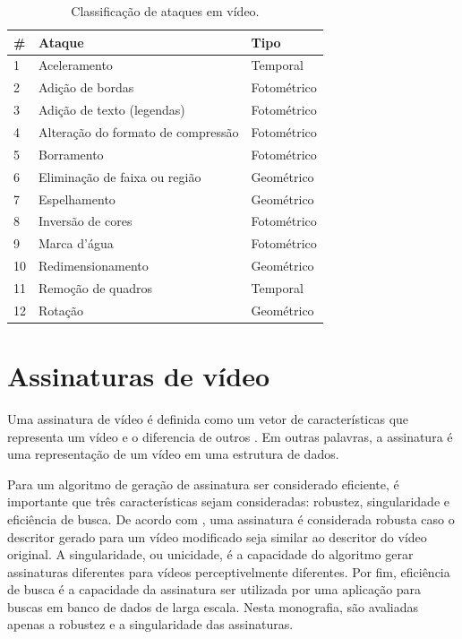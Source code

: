 \begin{table}[!ht]
\centering
\caption{Classificação de ataques em vídeo.}
\label{tab-classificacao-ataques}
\begin{tabular}{|l|l|l|}
\hline
\# & \textbf{Ataque}                    & \textbf{Tipo} \\ \hline
1           & Aceleramento                       & Temporal      \\ \hline
2           & Adição de bordas                   & Fotométrico   \\ \hline
3           & Adição de texto (legendas)         & Fotométrico   \\ \hline
4           & Alteração do formato de compressão & Fotométrico   \\ \hline
5           & Borramento                         & Fotométrico   \\ \hline
6           & Eliminação de faixa ou região      & Geométrico    \\ \hline
7           & Espelhamento                       & Geométrico   \\ \hline
8           & Inversão de cores                  & Fotométrico   \\ \hline
9           & Marca d'água                       & Fotométrico   \\ \hline
10          & Redimensionamento                  & Geométrico    \\ \hline
11          & Remoção de quadros                 & Temporal      \\ \hline
12          & Rotação                            & Geométrico    \\ \hline
\end{tabular}
\end{table}





\section{Assinaturas de vídeo}
\label{sec:assinatura} 
    
	Uma assinatura de vídeo é definida como um vetor de características que representa um vídeo e o diferencia de outros \cite{lee2008robust}. Em outras palavras, a assinatura é uma representação de um vídeo em uma estrutura de dados. 
        
	Para um algoritmo de geração de assinatura ser considerado eficiente, é importante que três características sejam consideradas: robustez, singularidade e eficiência de busca. De acordo com , uma assinatura é considerada robusta caso o descritor gerado para um vídeo modificado seja similar ao descritor do vídeo original. A singularidade, ou unicidade, é a capacidade do algoritmo gerar assinaturas diferentes para vídeos perceptivelmente diferentes. Por fim, eficiência de busca é a capacidade da assinatura  ser utilizada por uma aplicação para buscas em banco de dados de larga escala. Nesta monografia, são avaliadas apenas a robustez e a singularidade das assinaturas.   

